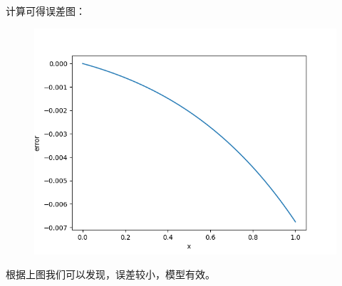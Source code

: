 \documentclass[12pt,a4paper]{article}
\begin{document}
计算可得误差图：
\begin{figure}[H]
	\centering
	\includegraphics[scale=0.5]{./figures/Figure_1.png}
\end{figure}

根据上图我们可以发现，误差较小，模型有效。
\end{document}
